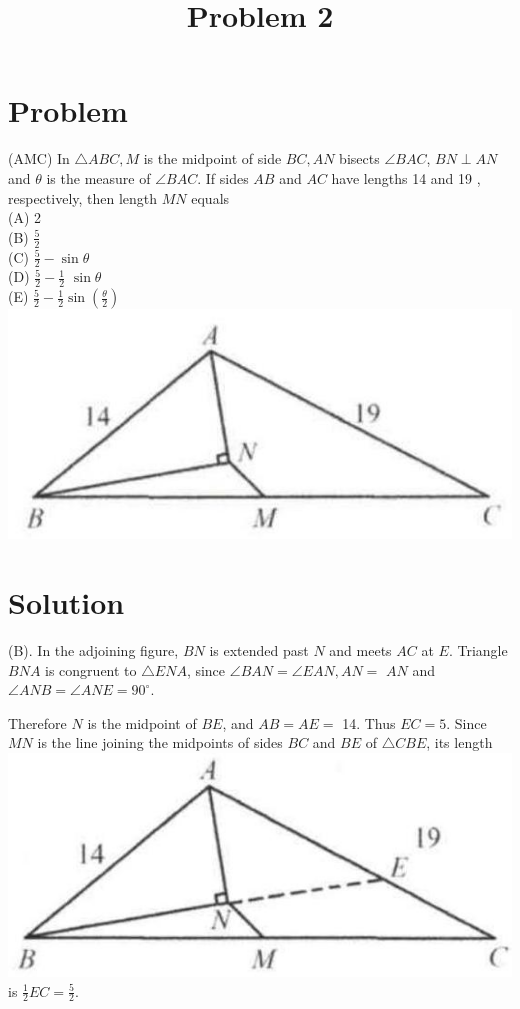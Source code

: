 \documentclass{article}
\title{Problem 2}
\date{}
\begin{document}
\maketitle

\section*{Problem}
(AMC) In \(\triangle A B C, M\) is the midpoint of side \(B C, A N\) bisects \(\angle B A C\), \(B N \perp A N\) and \(\theta\) is the measure of \(\angle B A C\). If sides \(A B\) and \(A C\) have lengths 14 and 19 , respectively, then length \(M N\) equals\\
(A) 2\\
(B) \(\frac{5}{2}\)\\
(C) \(\frac{5}{2}-\sin \theta\)\\
(D) \(\frac{5}{2}-\frac{1}{2}\) \(\sin \theta\)\\
(E) \(\frac{5}{2}-\frac{1}{2} \sin \left(\frac{\theta}{2}\right)\)\\
\centering
\includegraphics[width=\textwidth]{images/problem_image_1.jpg}

\section*{Solution}
(B).
In the adjoining figure, \(B N\) is extended past \(N\) and meets \(A C\) at \(E\). Triangle \(B N A\) is congruent to \(\triangle E N A\), since \(\angle B A N=\angle E A N, A N=\) \(A N\) and \(\angle A N B=\angle A N E=90^{\circ}\).

Therefore \(N\) is the midpoint of \(B E\), and \(A B=A E=\) 14. Thus \(E C=5\). Since \(M N\) is the line joining the midpoints of sides \(B C\) and \(B E\) of \(\triangle C B E\), its length\\
\includegraphics[width=\textwidth]{images/reasoning_image_1.jpg} is \(\frac{1}{2} E C=\frac{5}{2}\).
\end{document}
